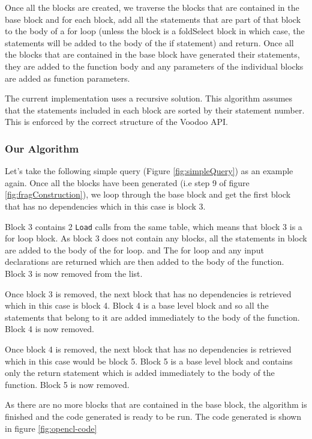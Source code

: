 Once all the blocks are created, we traverse the blocks that are contained in the base block and for each block, add all the statements that are part of that block to the body of a for loop (unless the block is a foldSelect block in which case, the statements will be added to the body of the if statement) and return. Once all the blocks that are contained in the base block have generated their statements, they are added to the function body and any parameters of the individual blocks are added as function parameters.

The current implementation uses a recursive solution. This algorithm assumes that the statements included in each block are sorted by their statement number. This is enforced by the correct structure of the Voodoo API.

\subsubsection{Our Algorithm}

Let's take the following simple query (Figure \ref{fig:simpleQuery}) as an example again. Once all the blocks have been generated (i.e step 9 of figure \ref{fig:fragConstruction}), we loop through the base block and get the first block that has no dependencies which in this case is block 3.

Block 3 contains 2 \texttt{Load} calls from the same table, which means that block 3 is a for loop block. As block 3 does not contain any blocks, all the statements in block are added to the body of the for loop. and The for loop and any input declarations are returned which are then added to the body of the function. Block 3 is now removed from the list.

Once block 3 is removed, the next block that has no dependencies is retrieved which in this case is block 4. Block 4 is a base level block and so all the statements that belong to it are added immediately to the body of the function. Block 4 is now removed.

Once block 4 is removed, the next block that has no dependencies is retrieved which in this case would be block 5. Block 5 is a base level block and contains only the return statement which is added immediately to the body of the function. Block 5 is now removed.

As there are no more blocks that are contained in the base block, the algorithm is finished and the code generated is ready to be run. The code generated is shown in figure \ref{fig:opencl-code}


